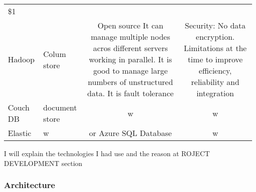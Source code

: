 \documentclass[]{article}
\begin{document}
\begin{longtable}[]{@{}llcc@{}}
\begin{minipage}[t]{0.30\columnwidth}
\$1\strut
\end{minipage}\tabularnewline
\begin{minipage}[t]{0.13\columnwidth}\raggedright
Hadoop\strut
\end{minipage} & \begin{minipage}[t]{0.17\columnwidth}\raggedright
Colum store\strut
\end{minipage} & \begin{minipage}[t]{0.30\columnwidth}\centering
Open source It can manage multiple nodes acros different servers working
in parallel. It is good to manage large numbers of unstructured data. It
is fault tolerance\strut
\end{minipage} & \begin{minipage}[t]{0.30\columnwidth}\centering
Security: No data encryption. Limitations at the time to improve
efficiency, reliability and integration\strut
\end{minipage}\tabularnewline
\begin{minipage}[t]{0.13\columnwidth}\raggedright
Couch DB\strut
\end{minipage} & \begin{minipage}[t]{0.17\columnwidth}\raggedright
document store\strut
\end{minipage} & \begin{minipage}[t]{0.30\columnwidth}\centering
w\strut
\end{minipage} & \begin{minipage}[t]{0.30\columnwidth}\centering
w\strut
\end{minipage}\tabularnewline
\begin{minipage}[t]{0.13\columnwidth}\raggedright
Elastic\strut
\end{minipage} & \begin{minipage}[t]{0.17\columnwidth}\raggedright
w\strut
\end{minipage} & \begin{minipage}[t]{0.30\columnwidth}\centering
or Azure SQL Database\strut
\end{minipage} & \begin{minipage}[t]{0.30\columnwidth}\centering
w\strut
\end{minipage}\tabularnewline
\bottomrule
\end{longtable}

I will explain the technologies I had use and the reason at ROJECT
DEVELOPMENT section

\hypertarget{architecture}{%
\subsubsection{Architecture}\label{architecture}}
\end{document}
